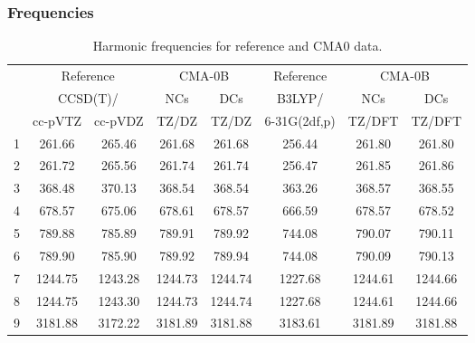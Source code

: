 \documentclass[10pt,oneside]{article}
\begin{document}
\subsubsection*{Frequencies}
\begin{table}[h!]
\centering
\caption{Harmonic frequencies for reference and CMA0 data.}
\begin{tabular}{cccccccc}
\toprule
{} & \multicolumn{2}{c}{Reference} & \multicolumn{2}{c}{CMA-0B} &    Reference & \multicolumn{2}{c}{CMA-0B} \\
{} & \multicolumn{2}{c}{CCSD(T)/} &     NCs &     DCs &       B3LYP/ &     NCs &     DCs \\
{} &   cc-pVTZ & cc-pVDZ &   TZ/DZ &   TZ/DZ & 6-31G(2df,p) &  TZ/DFT &  TZ/DFT \\
\midrule
1 &    261.66 &  265.46 &  261.68 &  261.68 &       256.44 &  261.80 &  261.80 \\
2 &    261.72 &  265.56 &  261.74 &  261.74 &       256.47 &  261.85 &  261.86 \\
3 &    368.48 &  370.13 &  368.54 &  368.54 &       363.26 &  368.57 &  368.55 \\
4 &    678.57 &  675.06 &  678.61 &  678.57 &       666.59 &  678.57 &  678.52 \\
5 &    789.88 &  785.89 &  789.91 &  789.92 &       744.08 &  790.07 &  790.11 \\
6 &    789.90 &  785.90 &  789.92 &  789.94 &       744.08 &  790.09 &  790.13 \\
7 &   1244.75 & 1243.28 & 1244.73 & 1244.74 &      1227.68 & 1244.61 & 1244.66 \\
8 &   1244.75 & 1243.30 & 1244.73 & 1244.74 &      1227.68 & 1244.61 & 1244.66 \\
9 &   3181.88 & 3172.22 & 3181.89 & 3181.88 &      3183.61 & 3181.89 & 3181.88 \\
\bottomrule
\end{tabular}
\end{table}

\clearpage
\end{document}
